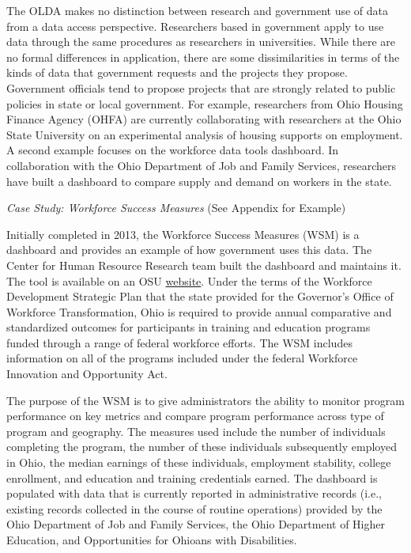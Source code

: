 The OLDA makes no distinction between research and government use of data from a data access perspective. Researchers based in government apply to use data through the same procedures as researchers in universities. While there are no formal differences in application, there are some dissimilarities in terms of the kinds of data that government requests and the projects they propose. Government officials tend to propose projects that are strongly related to public policies in state or local government. For example, researchers from Ohio Housing Finance Agency (OHFA) are currently collaborating with researchers at the Ohio State University on an experimental analysis of housing supports on employment. A second example focuses on the workforce data tools dashboard. In collaboration with the Ohio Department of Job and Family Services, researchers have built a dashboard to compare supply and demand on workers in the state.

\emph{Case Study: Workforce Success Measures} (See Appendix for Example)

Initially completed in 2013, the Workforce Success Measures (WSM) is a dashboard and provides an example of how government uses this data. The Center for Human Resource Research team built the dashboard and maintains it. The tool is available on an OSU \href{https://workforcesuccess.chrr.ohio-state.edu/home}{website}. Under the terms of the Workforce Development Strategic Plan that the state provided for the Governor's Office of Workforce Transformation, Ohio is required to provide annual comparative and standardized outcomes for participants in training and education programs funded through a range of federal workforce efforts. The WSM includes information on all of the programs included under the federal Workforce Innovation and Opportunity Act.

The purpose of the WSM is to give administrators the ability to monitor program performance on key metrics and compare program performance across type of program and geography. The measures used include the number of individuals completing the program, the number of these individuals subsequently employed in Ohio, the median earnings of these individuals, employment stability, college enrollment, and education and training credentials earned. The dashboard is populated with data that is currently reported in administrative records (i.e., existing records collected in the course of routine operations) provided by the Ohio Department of Job and Family Services, the Ohio Department of Higher Education, and Opportunities for Ohioans with Disabilities.

